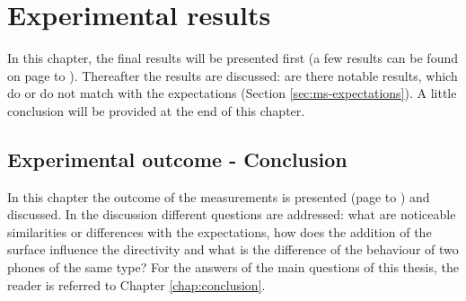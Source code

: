 \chapter{Experimental results}
\label{chap:outcome}
In this chapter, the final results will be presented first (a few results can be found on page \pageref{fig:res_NX506_pluis} to \pageref{fig:res_NX501_pluis}).
Thereafter the results are discussed: are there notable results, which do or do not match with the expectations (Section \ref{sec:ms-expectations}).
A little conclusion will be provided at the end of this chapter.


\clearpage

\section*{Experimental outcome - Conclusion}
In this chapter the outcome of the measurements is presented (page \pageref{fig:res_NX506_pluis} to \pageref{fig:res_NX501_pluis}) and discussed.
In the discussion different questions are addressed: what are noticeable similarities or differences with the expectations, how does the addition of the surface influence the directivity and what is the difference of the behaviour of two phones of the same type?
For the answers of the main questions of this thesis, the reader is referred to Chapter \ref{chap:conclusion}.

